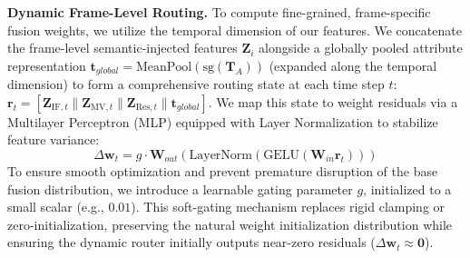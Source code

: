 \documentclass[letterpaper]{article} %
\begin{document}
\noindent\textbf{Dynamic Frame-Level Routing.} 
To compute fine-grained, frame-specific fusion weights, we utilize the temporal dimension of our features. We concatenate the frame-level semantic-injected features $\mathbf{Z}_i$ alongside a globally pooled attribute representation $\mathbf{t}_{global} = \text{MeanPool}(\text{sg}(\mathbf{T}_A))$ (expanded along the temporal dimension) to form a comprehensive routing state at each time step $t$: $\mathbf{r}_t = [\mathbf{Z}_{\text{IF}, t} \parallel \mathbf{Z}_{\text{MV}, t} \parallel \mathbf{Z}_{\text{Res}, t} \parallel \mathbf{t}_{global}]$. We map this state to weight residuals via a Multilayer Perceptron (MLP) equipped with Layer Normalization to stabilize feature variance:
$$\Delta \mathbf{w}_t = g \cdot \mathbf{W}_{out} (\text{LayerNorm}(\text{GELU}(\mathbf{W}_{in}\mathbf{r}_t)))$$
To ensure smooth optimization and prevent premature disruption of the base fusion distribution, we introduce a learnable gating parameter $g$, initialized to a small scalar (e.g., $0.01$). This soft-gating mechanism replaces rigid clamping or zero-initialization, preserving the natural weight initialization distribution while ensuring the dynamic router initially outputs near-zero residuals ($\Delta \mathbf{w}_t \approx \mathbf{0}$).
\end{document}
